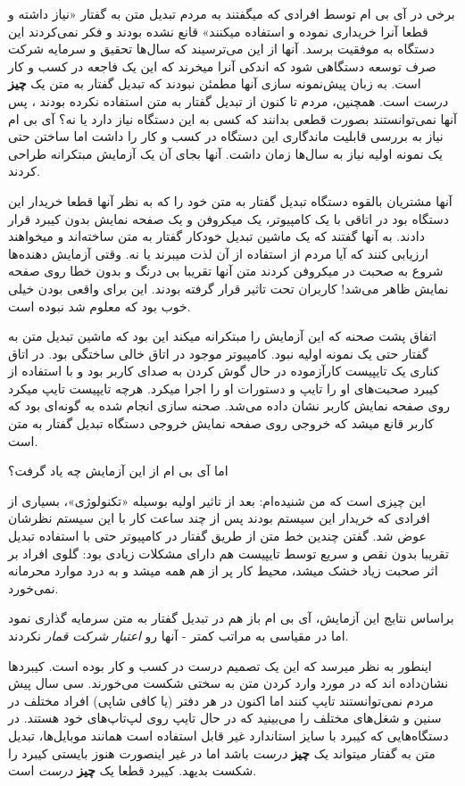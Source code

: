 برخی در آی بی ام توسط افرادی که میگفتند به مردم تبدیل متن به گفتار «نیاز
داشته و قطعا آنرا خریداری نموده و استفاده میکنند» قانع نشده بودند و فکر
نمی‌کردند این دستگاه به موفقیت برسد. آنها از این می‌ترسیند که سال‌ها
تحقیق و سرمایه شرکت صرف توسعه دستگاهی شود که اندکی آنرا میخرند که این یک
فاجعه در کسب و کار است. به زبان پیش‌نمونه سازی آنها مطمئن نبودند که
تبدیل گفتار به متن یک \textbf{چیز} \emph{درست} است. همچنین، مردم تا کنون
از تبدیل گفتار به متن استفاده نکرده بودند ، پس آنها نمی‌توانستند بصورت
قطعی بدانند که کسی به این دستگاه نیاز دارد یا نه؟ آی بی ام نیاز به بررسی
قابلیت ماندگاری این دستگاه در کسب و کار را داشت اما ساختن حتی یک نمونه
اولیه نیاز به سال‌ها زمان داشت. آنها بجای آن یک آزمایش مبتکرانه طراحی
کردند.

آنها مشتریان بالقوه دستگاه تبدیل گفتار به متن خود را که به نظر آنها قطعا
خریدار این دستگاه بود در اتاقی با یک کامپیوتر، یک میکروفن و یک صفحه
نمایش بدون کیبرد قرار دادند. به آنها گفتند که یک ماشین تبدیل خودکار
گفتار به متن ساخته‌اند و میخواهند ارزیابی کنند که آیا مردم از استفاده از
آن لذت میبرند یا نه. وقتی آزمایش دهنده‌ها شروع به صحبت در میکروفن کردند
متن آنها تقریبا بی درنگ و بدون خطا روی صفحه نمایش ظاهر می‌شد! کاربران
تحت تاثیر قرار گرفته بودند. این برای واقعی بودن خیلی خوب بود که معلوم شد
نبوده است.

اتفاق پشت صحنه که این آزمایش را مبتکرانه میکند این بود که ماشین تبدیل
متن به گفتار حتی یک نمونه اولیه نبود. کامپیوتر موجود در اتاق خالی ساختگی
بود. در اتاق کناری یک تایپیست کارآزموده در حال گوش کردن به صدای کاربر
بود و با استفاده از کیبرد صحبت‌های او را تایپ و دستورات او را اجرا
میکرد. هرچه تایپیست تایپ میکرد روی صفحه نمایش کاربر نشان داده می‌شد.
صحنه سازی انجام شده به گونه‌ای بود که کاربر قانع میشد که خروجی روی صفحه
نمایش خروجی دستگاه تبدیل گفتار به متن است.

اما آی بی ام از این آزمایش چه یاد گرفت؟

این چیزی است که من شنیده‌ام: بعد از تاثیر اولیه بوسیله «تکنولوژی»،
بسیاری از افرادی که خریدار این سیستم بودند پس از چند ساعت کار با این
سیستم نظرشان عوض شد. گفتن چندین خط متن از طریق گفتار در کامپیوتر حتی با
استفاده تبدیل تقریبا بدون نقص و سریع توسط تایپیست هم دارای مشکلات زیادی
بود: گلوی افراد بر اثر صحبت زیاد خشک میشد، محیط کار پر از هم همه میشد و
به درد موارد محرمانه نمی‌خورد.

براساس نتایج این آزمایش، آی بی ام باز هم در تبدیل گفتار به متن سرمایه
گذاری نمود اما در مقیاسی به مراتب کمتر - آنها رو \emph{اعتبار شرکت قمار}
نکردند.

اینطور به نظر میرسد که این یک تصمیم درست در کسب و کار بوده است. کیبردها
نشان‌داده اند که در مورد وارد کردن متن به سختی شکست می‌خورند. سی سال پیش
مردم نمی‌توانستند تایپ کنند اما اکنون در هر دفتر (یا کافی شاپی) افراد
مختلف در سنین و شغل‌های مختلف را می‌بینید که در حال تایپ روی لپ‌تاپ‌های
خود هستند. در دستگاه‌هایی که کیبرد با سایز استاندارد غیر قابل استفاده
است همانند موبایل‌ها، تبدیل متن به گفتار میتواند یک \textbf{چیز}
\emph{درست} باشد اما در غیر اینصورت هنوز بایستی کیبرد را شکست بدیهد.
کیبرد قطعا یک \textbf{چیز} \emph{درست} است.

